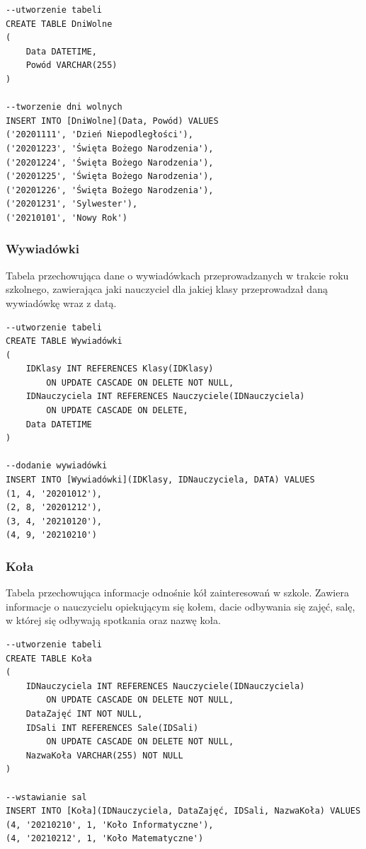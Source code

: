 \documentclass[60pt]{article}
\begin{document}
\begin{verbatim}
--utworzenie tabeli
CREATE TABLE DniWolne
(
    Data DATETIME,
    Powód VARCHAR(255)
)

--tworzenie dni wolnych
INSERT INTO [DniWolne](Data, Powód) VALUES
('20201111', 'Dzień Niepodległości'),
('20201223', 'Święta Bożego Narodzenia'),
('20201224', 'Święta Bożego Narodzenia'),
('20201225', 'Święta Bożego Narodzenia'),
('20201226', 'Święta Bożego Narodzenia'),
('20201231', 'Sylwester'),
('20210101', 'Nowy Rok')
\end{verbatim}

 \subsubsection{Wywiadówki}
Tabela przechowująca dane o wywiadówkach przeprowadzanych w trakcie roku szkolnego, zawierająca jaki nauczyciel dla jakiej klasy przeprowadzał daną wywiadówkę wraz z datą.
 
\begin{verbatim}
--utworzenie tabeli
CREATE TABLE Wywiadówki
(
	IDKlasy INT REFERENCES Klasy(IDKlasy) 
	    ON UPDATE CASCADE ON DELETE NOT NULL,
	IDNauczyciela INT REFERENCES Nauczyciele(IDNauczyciela) 
	    ON UPDATE CASCADE ON DELETE,
	Data DATETIME
)

--dodanie wywiadówki
INSERT INTO [Wywiadówki](IDKlasy, IDNauczyciela, DATA) VALUES
(1, 4, '20201012'),
(2, 8, '20201212'),
(3, 4, '20210120'),
(4, 9, '20210210')
\end{verbatim}

 \subsubsection{Koła}
Tabela przechowująca informacje odnośnie kół zainteresowań w szkole. Zawiera informacje o nauczycielu opiekującym się kołem, dacie odbywania się zajęć, salę, w której się odbywają spotkania oraz nazwę koła.
 
\begin{verbatim}
--utworzenie tabeli
CREATE TABLE Koła
(
	IDNauczyciela INT REFERENCES Nauczyciele(IDNauczyciela) 
	    ON UPDATE CASCADE ON DELETE NOT NULL,
	DataZajęć INT NOT NULL,
	IDSali INT REFERENCES Sale(IDSali) 
	    ON UPDATE CASCADE ON DELETE NOT NULL,
	NazwaKoła VARCHAR(255) NOT NULL
)

--wstawianie sal
INSERT INTO [Koła](IDNauczyciela, DataZajęć, IDSali, NazwaKoła) VALUES
(4, '20210210', 1, 'Koło Informatyczne'),
(4, '20210212', 1, 'Koło Matematyczne')
\end{verbatim}
\end{document}
